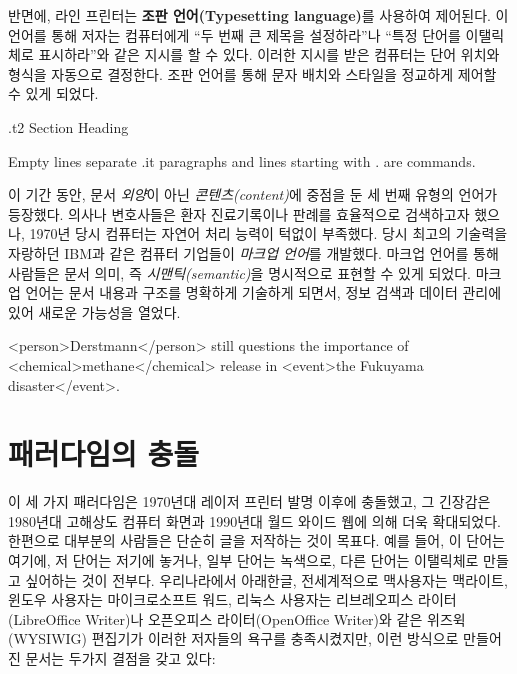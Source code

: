 \documentclass[
  letterpaper,
]{book}
\newenvironment{Shaded}{\begin{snugshade}}{\end{snugshade}}
\newcommand{\AttributeTok}[1]{\textcolor[rgb]{0.40,0.45,0.13}{#1}}
\begin{document}
반면에, 라인 프린터는 \textbf{조판 언어(Typesetting language)}를
사용하여 제어된다. 이 언어를 통해 저자는 컴퓨터에게 ``두 번째 큰 제목을
설정하라''나 ``특정 단어를 이탤릭체로 표시하라''와 같은 지시를 할 수
있다. 이러한 지시를 받은 컴퓨터는 단어 위치와 형식을 자동으로 결정한다.
조판 언어를 통해 문자 배치와 스타일을 정교하게 제어할 수 있게 되었다.

\begin{Shaded}
\begin{Highlighting}[]
\AttributeTok{.t2 Section Heading}

\AttributeTok{Empty lines separate}
\AttributeTok{.it paragraphs}
\AttributeTok{and lines starting with \textquotesingle{}.\textquotesingle{} are commands.}
\end{Highlighting}
\end{Shaded}

이 기간 동안, 문서 \emph{외양}이 아닌 \emph{콘텐츠(content)}에 중점을 둔
세 번째 유형의 언어가 등장했다. 의사나 변호사들은 환자 진료기록이나
판례를 효율적으로 검색하고자 했으나, 1970년 당시 컴퓨터는 자연어 처리
능력이 턱없이 부족했다. 당시 최고의 기술력을 자랑하던 IBM과 같은 컴퓨터
기업들이 \emph{마크업 언어}를 개발했다. 마크업 언어를 통해 사람들은 문서
의미, 즉 \emph{시맨틱(semantic)}을 명시적으로 표현할 수 있게 되었다.
마크업 언어는 문서 내용과 구조를 명확하게 기술하게 되면서, 정보 검색과
데이터 관리에 있어 새로운 가능성을 열었다.

\begin{Shaded}
\begin{Highlighting}[]
\AttributeTok{\textless{}person\textgreater{}Derstmann\textless{}/person\textgreater{} still questions the importance of \textless{}chemical\textgreater{}methane\textless{}/chemical\textgreater{} release}
\AttributeTok{in \textless{}event\textgreater{}the Fukuyama disaster\textless{}/event\textgreater{}.}
\end{Highlighting}
\end{Shaded}

\hypertarget{uxd328uxb7ecuxb2e4uxc784uxc758-uxcda9uxb3cc}{%
\section{패러다임의
충돌}\label{uxd328uxb7ecuxb2e4uxc784uxc758-uxcda9uxb3cc}}

이 세 가지 패러다임은 1970년대 레이저 프린터 발명 이후에 충돌했고, 그
긴장감은 1980년대 고해상도 컴퓨터 화면과 1990년대 월드 와이드 웹에 의해
더욱 확대되었다. 한편으로 대부분의 사람들은 단순히 글을 저작하는 것이
목표다. 예를 들어, 이 단어는 여기에, 저 단어는 저기에 놓거나, 일부
단어는 녹색으로, 다른 단어는 이탤릭체로 만들고 싶어하는 것이 전부다.
우리나라에서 아래한글, 전세계적으로 맥사용자는 맥라이트, 윈도우 사용자는
마이크로소프트 워드, 리눅스 사용자는 리브레오피스 라이터(LibreOffice
Writer)나 오픈오피스 라이터(OpenOffice Writer)와 같은 위즈윅(WYSIWIG)
편집기가 이러한 저자들의 욕구를 충족시켰지만, 이런 방식으로 만들어진
문서는 두가지 결점을 갖고 있다:
\end{document}
